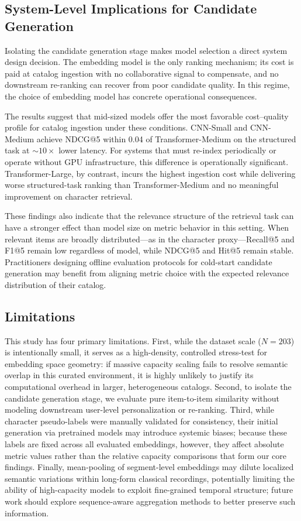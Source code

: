 \documentclass[sigconf]{acmart}
\begin{document}
\subsection{System-Level Implications for Candidate Generation}

Isolating the candidate generation stage makes model selection a direct system design decision. The embedding model is the only ranking mechanism; its cost is paid at catalog ingestion with no collaborative signal to compensate, and no downstream re-ranking can recover from poor candidate quality. In this regime, the choice of embedding model has concrete operational consequences.

The results suggest that mid-sized models offer the most favorable cost--quality profile for catalog ingestion under these conditions. CNN-Small and CNN-Medium achieve NDCG@5 within 0.04 of Transformer-Medium on the structured task at ${\sim}10{\times}$ lower latency. For systems that must re-index periodically or operate without GPU infrastructure, this difference is operationally significant. Transformer-Large, by contrast, incurs the highest ingestion cost while delivering worse structured-task ranking than Transformer-Medium and no meaningful improvement on character retrieval.

These findings also indicate that the relevance structure of the retrieval task can have a stronger effect than model size on metric behavior in this setting. When relevant items are broadly distributed---as in the character proxy---Recall@5 and F1@5 remain low regardless of model, while NDCG@5 and Hit@5 remain stable. Practitioners designing offline evaluation protocols for cold-start candidate generation may benefit from aligning metric choice with the expected relevance distribution of their catalog.

\subsection{Limitations}

This study has four primary limitations. First, while the dataset scale ($N{=}203$) is intentionally small, it serves as a high-density, controlled stress-test for embedding space geometry: if massive capacity scaling fails to resolve semantic overlap in this curated environment, it is highly unlikely to justify its computational overhead in larger, heterogeneous catalogs. Second, to isolate the candidate generation stage, we evaluate pure item-to-item similarity without modeling downstream user-level personalization or re-ranking. Third, while character pseudo-labels were manually validated for consistency, their initial generation via pretrained models may introduce systemic biases; because these labels are fixed across all evaluated embeddings, however, they affect absolute metric values rather than the relative capacity comparisons that form our core findings. Finally, mean-pooling of segment-level embeddings may dilute localized semantic variations within long-form classical recordings, potentially limiting the ability of high-capacity models to exploit fine-grained temporal structure; future work should explore sequence-aware aggregation methods to better preserve such information.
\end{document}

